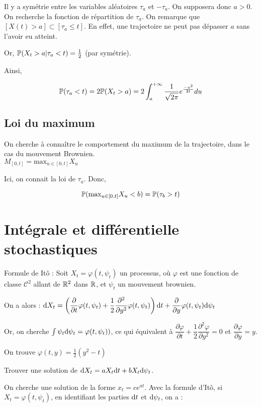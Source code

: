 \Rq Il y a symétrie entre les variables aléatoires $\tau_a$ et $-\tau_a$. On supposera donc $a>0$. \\

On recherche la fonction de répartition de $\tau_a$. On remarque que $[X(t) > a] \subset [\tau_a \leq t]$. En effet, une trajectoire ne peut pas dépasser $a$ sans l'avoir eu atteint.

Or, $\P(X_t > a \vert \tau_a < t) = \frac{1}{2}$ (par symétrie).

Ainsi,

\[ \P(\tau_a < t) = 2\P(X_t > a) = 2 \int_a^{+\infty} \frac{1}{\sqrt{2\pi}} e^{\frac{-u^2}{2t}} du \]

\subsection{Loi du maximum}

On cherche à connaître le comportement du maximum de la trajectoire, dans le cas du mouvement Brownien. \\
$M_{[0,t]} = \text{max}_{u \in [0,t]} X_u$

Ici, on connait la loi de $\tau_a$. Donc,

\[ \P(\text{max}_{u \in [0,t]} X_u < b) = \P(\tau_b > t) \]

\section{Intégrale et différentielle stochastiques}

Formule de Itô : Soit $X_t = \varphi(t,\psi_t)$ un processus, où $\varphi$ est une fonction de classe $\mathcal{C}^2$ allant de $\R^2$ dans $\R$, et $\psi_t$ un mouvement brownien.

On a alors :
$\ud X_t = \left(\dfrac{\partial }{\partial t}\varphi(t,\psi_t) + \dfrac{1}{2}\dfrac{\partial^2}{\partial y^2}\varphi(t,\psi_t)\right) \ud t + \dfrac{\partial}{\partial y}\varphi(t,\psi_t) \ud \psi_t $

Or, on cherche $\int \psi_t \ud \psi_t = \varphi(t,\psi_t))$, ce qui équivalent à $\dfrac{\partial \varphi}{\partial t} + \dfrac{1}{2}\dfrac{\partial^2 \varphi}{\partial y^2} = 0$ et $\dfrac{\partial \varphi}{\partial y} = y$.

On trouve $\varphi(t,y) = \frac{1}{2}(y^2-t)$

Trouver une solution de $\ud X_t = aX_t \ud t + b X_t \ud \psi_t$.

On cherche une solution de la forme $x_t = ce^{at}$. Avec la formule d'Itô, si $X_t = \varphi(t,\psi_t)$, en identifiant les parties $\ud t$ et $\ud \psi_t$, on a :


